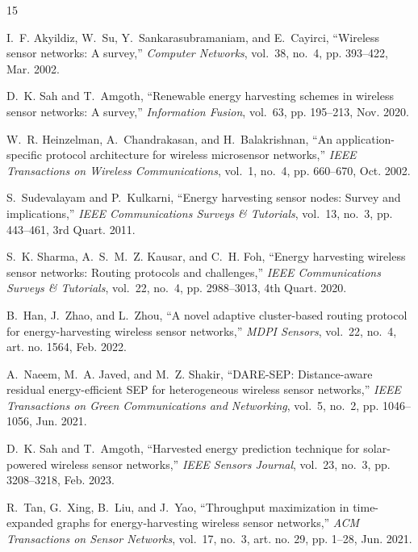 \documentclass[journal]{IEEEtran}
\begin{document}

\begin{thebibliography}{15}

I.~F. Akyildiz, W.~Su, Y.~Sankarasubramaniam, and E.~Cayirci, ``Wireless sensor networks: A survey,'' \textit{Computer Networks}, vol.~38, no.~4, pp. 393--422, Mar. 2002.

D.~K. Sah and T.~Amgoth, ``Renewable energy harvesting schemes in wireless sensor networks: A survey,'' \textit{Information Fusion}, vol.~63, pp. 195--213, Nov. 2020.

W.~R. Heinzelman, A.~Chandrakasan, and H.~Balakrishnan, ``An application-specific protocol architecture for wireless microsensor networks,'' \textit{IEEE Transactions on Wireless Communications}, vol.~1, no.~4, pp. 660--670, Oct. 2002.

S.~Sudevalayam and P.~Kulkarni, ``Energy harvesting sensor nodes: Survey and implications,'' \textit{IEEE Communications Surveys \& Tutorials}, vol.~13, no.~3, pp. 443--461, 3rd Quart. 2011.

S.~K. Sharma, A.~S.~M.~Z. Kausar, and C.~H. Foh, ``Energy harvesting wireless sensor networks: Routing protocols and challenges,'' \textit{IEEE Communications Surveys \& Tutorials}, vol.~22, no.~4, pp. 2988--3013, 4th Quart. 2020.

B.~Han, J.~Zhao, and L.~Zhou, ``A novel adaptive cluster-based routing protocol for energy-harvesting wireless sensor networks,'' \textit{MDPI Sensors}, vol.~22, no.~4, art. no. 1564, Feb. 2022.

A.~Naeem, M.~A. Javed, and M.~Z. Shakir, ``DARE-SEP: Distance-aware residual energy-efficient SEP for heterogeneous wireless sensor networks,'' \textit{IEEE Transactions on Green Communications and Networking}, vol.~5, no.~2, pp. 1046--1056, Jun. 2021.

D.~K. Sah and T.~Amgoth, ``Harvested energy prediction technique for solar-powered wireless sensor networks,'' \textit{IEEE Sensors Journal}, vol.~23, no.~3, pp. 3208--3218, Feb. 2023.

R.~Tan, G.~Xing, B.~Liu, and J.~Yao, ``Throughput maximization in time-expanded graphs for energy-harvesting wireless sensor networks,'' \textit{ACM Transactions on Sensor Networks}, vol.~17, no.~3, art. no. 29, pp. 1--28, Jun. 2021.


\end{thebibliography}
\end{document}
